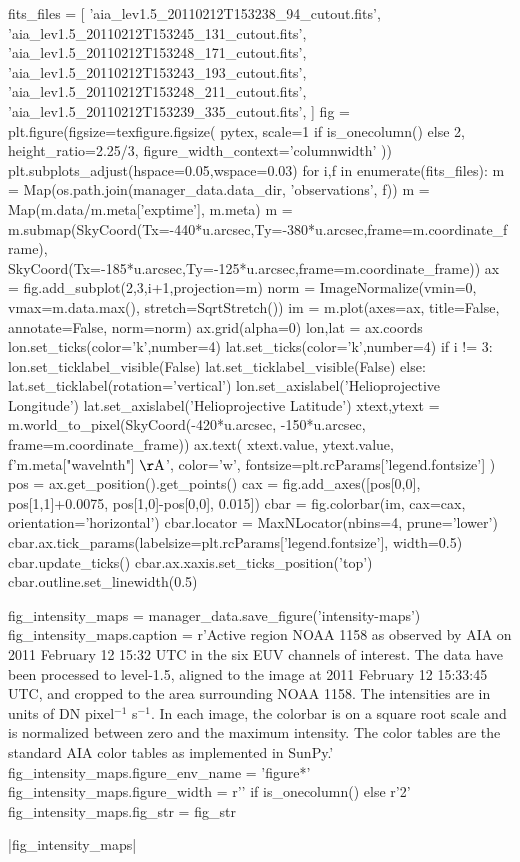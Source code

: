 \begin{pycode}
fits_files = [
    'aia_lev1.5_20110212T153238_94_cutout.fits',
    'aia_lev1.5_20110212T153245_131_cutout.fits',
    'aia_lev1.5_20110212T153248_171_cutout.fits',
    'aia_lev1.5_20110212T153243_193_cutout.fits',
    'aia_lev1.5_20110212T153248_211_cutout.fits',
    'aia_lev1.5_20110212T153239_335_cutout.fits',
]
fig = plt.figure(figsize=texfigure.figsize(
    pytex,
    scale=1 if is_onecolumn() else 2,
    height_ratio=2.25/3,
    figure_width_context='columnwidth'
))
plt.subplots_adjust(hspace=0.05,wspace=0.03)
for i,f in enumerate(fits_files):
    m = Map(os.path.join(manager_data.data_dir, 'observations', f))
    m = Map(m.data/m.meta['exptime'], m.meta)
    m = m.submap(SkyCoord(Tx=-440*u.arcsec,Ty=-380*u.arcsec,frame=m.coordinate_frame),
                 SkyCoord(Tx=-185*u.arcsec,Ty=-125*u.arcsec,frame=m.coordinate_frame))
    ax = fig.add_subplot(2,3,i+1,projection=m)
    norm = ImageNormalize(vmin=0, vmax=m.data.max(), stretch=SqrtStretch())
    im = m.plot(axes=ax, title=False, annotate=False, norm=norm)
    ax.grid(alpha=0)
    lon,lat = ax.coords
    lon.set_ticks(color='k',number=4)
    lat.set_ticks(color='k',number=4)
    if i != 3:
        lon.set_ticklabel_visible(False)
        lat.set_ticklabel_visible(False)
    else:
        lat.set_ticklabel(rotation='vertical')
        lon.set_axislabel('Helioprojective Longitude')
        lat.set_axislabel('Helioprojective Latitude')
    xtext,ytext = m.world_to_pixel(SkyCoord(-420*u.arcsec, -150*u.arcsec, frame=m.coordinate_frame))
    ax.text(
        xtext.value, ytext.value,
        f'{m.meta["wavelnth"]} $\mathrm{{\AA}}$',
        color='w',
        fontsize=plt.rcParams['legend.fontsize']
    )
    pos = ax.get_position().get_points()
    cax = fig.add_axes([pos[0,0], pos[1,1]+0.0075, pos[1,0]-pos[0,0], 0.015])
    cbar = fig.colorbar(im, cax=cax, orientation='horizontal')
    cbar.locator = MaxNLocator(nbins=4, prune='lower')
    cbar.ax.tick_params(labelsize=plt.rcParams['legend.fontsize'], width=0.5)
    cbar.update_ticks()
    cbar.ax.xaxis.set_ticks_position('top')
    cbar.outline.set_linewidth(0.5)

fig_intensity_maps = manager_data.save_figure('intensity-maps')
fig_intensity_maps.caption = r'Active region NOAA 1158 as observed by AIA on 2011 February 12 15:32 UTC in the six EUV channels of interest. The data have been processed to level-1.5, aligned to the image at 2011 February 12 15:33:45 UTC, and cropped to the area surrounding NOAA 1158. The intensities are in units of DN pixel$^{-1}$ s$^{-1}$. In each image, the colorbar is on a square root scale and is normalized between zero and the maximum intensity. The color tables are the standard AIA color tables as implemented in SunPy.'
fig_intensity_maps.figure_env_name = 'figure*'
fig_intensity_maps.figure_width = r'\columnwidth' if is_onecolumn() else r'2\columnwidth'
fig_intensity_maps.fig_str = fig_str
\end{pycode}
|fig_intensity_maps|

